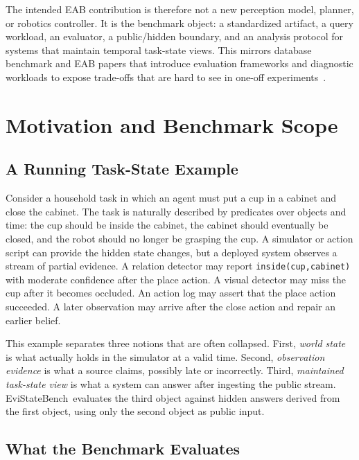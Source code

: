 \documentclass[conference]{IEEEtran}
\newcommand{\bench}{EviStateBench}
\begin{document}
The intended EAB contribution is therefore not a new perception model, planner, or robotics controller. It is the benchmark object: a standardized artifact, a query workload, an evaluator, a public/hidden boundary, and an analysis protocol for systems that maintain temporal task-state views. This mirrors database benchmark and EAB papers that introduce evaluation frameworks and diagnostic workloads to expose trade-offs that are hard to see in one-off experiments~\cite{erling2015ldbc,iosup2016ldbc,khelifati2023tsmbench,qi2025finbench,malekpour2026sqlmorph,najafi2025beacon,mu2025aqp}.

\section{Motivation and Benchmark Scope}
\label{sec:motivation}

\subsection{A Running Task-State Example}

Consider a household task in which an agent must put a cup in a cabinet and close the cabinet. The task is naturally described by predicates over objects and time: the cup should be inside the cabinet, the cabinet should eventually be closed, and the robot should no longer be grasping the cup. A simulator or action script can provide the hidden state changes, but a deployed system observes a stream of partial evidence. A relation detector may report \texttt{inside(cup,cabinet)} with moderate confidence after the place action. A visual detector may miss the cup after it becomes occluded. An action log may assert that the place action succeeded. A later observation may arrive after the close action and repair an earlier belief.

This example separates three notions that are often collapsed. First, \emph{world state} is what actually holds in the simulator at a valid time. Second, \emph{observation evidence} is what a source claims, possibly late or incorrectly. Third, \emph{maintained task-state view} is what a system can answer after ingesting the public stream. \bench\ evaluates the third object against hidden answers derived from the first object, using only the second object as public input.

\subsection{What the Benchmark Evaluates}
\end{document}
